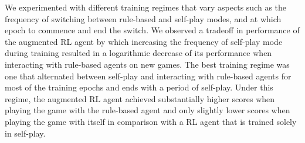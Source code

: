 \documentclass[letterpaper]{article} %
\begin{document}
We experimented with different training regimes that vary aspects such as the frequency of switching between rule-based 
and self-play modes, and at which epoch to commence and end the switch.
 We observed a tradeoff in   performance  of the augmented RL agent by which increasing the frequency of self-play mode 
 during training resulted in a  logarithmic decrease of  its performance when interacting with  rule-based agents  on new games.
The best training regime was one that  alternated between self-play and interacting with  rule-based agents for most of the training epochs and ends with a period of  self-play. 
Under this regime, the augmented RL agent achieved substantially higher scores when playing the game with the rule-based agent and only slightly lower scores when playing the game with itself in comparison with a RL agent that is trained solely in self-play.  


 
 
\end{document}
